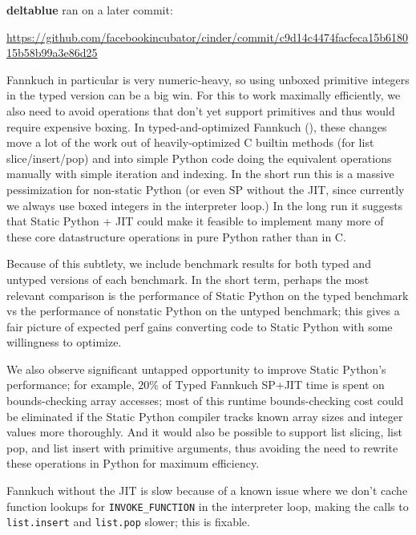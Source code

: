 \documentclass[english,cleveref,submission]{programming}
\newcommand{\code}[1]{\texttt{#1}}
\newcommand{\bmname}[1]{\textbf{#1}}
\begin{document}
\noindent\bmname{deltablue} ran on a later commit:

\begin{center}
\footnotesize\url{https://github.com/facebookincubator/cinder/commit/c9d14c4474facfeca15b618015b58b99a3e86d25}
\end{center}

Fannkuch in particular is very numeric-heavy, so using unboxed primitive
integers in the typed version can be a big win. For this to work maximally
efficiently, we also need to avoid operations that don't yet support primitives
and thus would require expensive boxing. In typed-and-optimized Fannkuch (), these changes move
a lot of the work out of heavily-optimized C builtin methods (for list
slice/insert/pop) and into simple Python code doing the equivalent operations
manually with simple iteration and indexing. In the short run this is a massive
pessimization for non-static Python (or even SP without the JIT, since
currently we always use boxed integers in the interpreter loop.) In the long
run it suggests that Static Python + JIT could make it feasible to implement
many more of these core datastructure operations in pure Python rather than in
C.

Because of this subtlety, we include benchmark results for both typed and
untyped versions of each benchmark. In the short term, perhaps the most
relevant comparison is the performance of Static Python on the typed benchmark
vs the performance of nonstatic Python on the untyped benchmark; this gives a
fair picture of expected perf gains converting code to Static Python with some
willingness to optimize.

We also observe significant untapped opportunity to improve Static Python's
performance; for example, $20\%$ of Typed Fannkuch SP+JIT time is spent on
bounds-checking array accesses; most of this runtime bounds-checking cost could
be eliminated if the Static Python compiler tracks known array sizes and
integer values more thoroughly. And it would also be possible to support list
slicing, list pop, and list insert with primitive arguments, thus avoiding the
need to rewrite these operations in Python for maximum efficiency.

 Fannkuch without the JIT is slow because of a known issue where we
don't cache function lookups for \code{INVOKE\_FUNCTION} in the interpreter loop,
making the calls to \code{list.insert} and \code{list.pop} slower; this is fixable.
\end{document}
